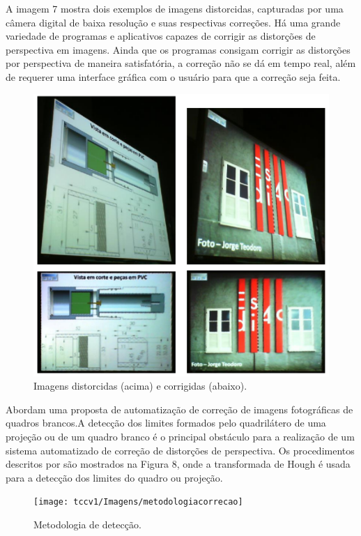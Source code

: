 A imagem 7 mostra dois exemplos de imagens distorcidas, capturadas por uma câmera digital de baixa resolução e suas respectivas correções. Há uma grande variedade de programas e aplicativos capazes de corrigir as distorções de perspectiva em imagens. Ainda que os programas consigam corrigir as distorções por perspectiva de maneira satisfatória, a correção não se dá em tempo real, além de requerer uma interface gráfica com o usuário para que a correção seja feita.
 \begin{figure}[h]
	\centering
	\includegraphics[width=1.0\textwidth]{Imagens/imagensdistorcidas} 
	\caption[Imagens distorcidas e corrigidas.]{Imagens distorcidas (acima) e corrigidas (abaixo).}
	\label{fig:tux_laplace}
\end{figure}

 Abordam uma proposta de automatização de correção de imagens fotográficas de quadros brancos.A detecção dos limites formados pelo quadrilátero de uma projeção ou de um quadro branco é o principal obstáculo para a realização de um sistema automatizado de correção de distorções de perspectiva. Os procedimentos descritos por  são mostrados na Figura 8, onde a transformada de Hough é usada para a detecção dos limites do quadro ou projeção.

 \begin{figure}[h]
	\centering
	\texttt{[image: tccv1/Imagens/metodologiacorrecao]} 
	\caption[Metodologia de detecção.]{Metodologia de detecção.}
	\label{fig:tux_laplace}
\end{figure}

